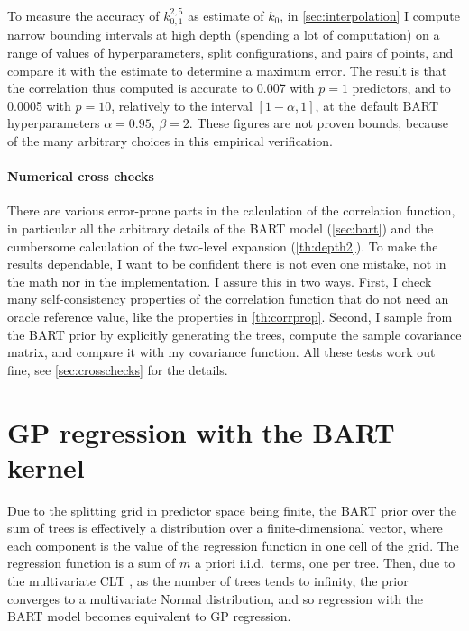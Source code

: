\documentclass[a4paper]{article}
\theoremstyle{definition}
\begin{document}
    To measure the accuracy of $k^{2,5}_{0,1}$ as estimate of $k_0$, in \autoref{sec:interpolation} I compute narrow bounding intervals at high depth (spending a lot of computation) on a range of values of hyperparameters, split configurations, and pairs of points, and compare it with the estimate to determine a maximum error. The result is that the correlation thus computed is accurate to 0.007 with $p=1$ predictors, and to 0.0005 with $p=10$, relatively to the interval $[1 - \alpha, 1]$, at the default BART hyperparameters $\alpha=0.95$, $\beta=2$. These figures are not proven bounds, because of the many arbitrary choices in this empirical verification.
    
    \paragraph{Numerical cross checks}

    There are various error-prone parts in the calculation of the correlation function, in particular all the arbitrary details of the BART model (\autoref{sec:bart}) and the cumbersome calculation of the two-level expansion (\autoref{th:depth2}). To make the results dependable, I want to be confident there is not even one mistake, not in the math nor in the implementation. I assure this in two ways. First, I check many self-consistency properties of the correlation function that do not need an oracle reference value, like the properties in \autoref{th:corrprop}. Second, I sample from the BART prior by explicitly generating the trees, compute the sample covariance matrix, and compare it with my covariance function. All these tests work out fine, see \autoref{sec:crosschecks} for the details.

    \section{GP regression with the BART kernel}
    \label{sec:empirical}

    Due to the splitting grid in predictor space being finite, the BART prior over the sum of trees is effectively a distribution over a finite-dimensional vector, where each component is the value of the regression function in one cell of the grid. The regression function is a sum of $m$ a priori i.i.d.\ terms, one per tree. Then, due to the multivariate CLT \autocite[16]{vandervaart1998}, as the number of trees tends to infinity, the prior converges to a multivariate Normal distribution, and so regression with the BART model becomes equivalent to GP regression.
    
\end{document}
